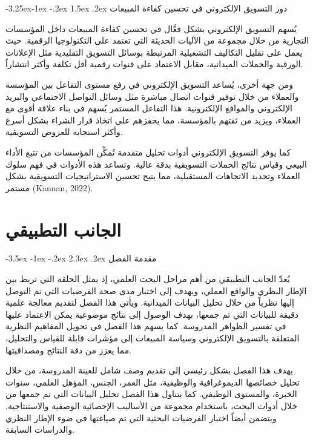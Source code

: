 \documentclass[12pt, a4paper]{report}
\makeatletter
\newcommand{\lr}[1]{\textenglish{#1}}
\renewcommand\section{\@startsection{section}{1}{\z@}%
  {-3.5ex \@plus -1ex \@minus -.2ex}%
  {2.3ex \@plus .2ex}%
  {\normalfont\Large\bfseries\color{primaryblue}}}
\renewcommand\subsection{\@startsection{subsection}{2}{\z@}%
  {-3.25ex\@plus -1ex \@minus -.2ex}%
  {1.5ex \@plus .2ex}%
  {\normalfont\large\bfseries\color{sectiongray}}}
\makeatother
\begin{document}
\subsection{دور التسويق الإلكتروني في تحسين كفاءة المبيعات}

يُسهم التسويق الإلكتروني بشكل فعَّال في تحسين كفاءة المبيعات داخل المؤسسات التجارية من خلال مجموعة من الآليات الحديثة التي تعتمد على التكنولوجيا الرقمية. حيث يعمل على تقليل التكاليف التشغيلية المرتبطة بوسائل التسويق التقليدية مثل الإعلانات الورقية والحملات الميدانية، مقابل الاعتماد على قنوات رقمية أقل تكلفة وأكثر انتشاراً.

ومن جهة أخرى، يُساعد التسويق الإلكتروني في رفع مستوى التفاعل بين المؤسسة والعملاء من خلال توفير قنوات اتصال مباشرة مثل وسائل التواصل الاجتماعي والبريد الإلكتروني والمواقع الإلكترونية. هذا التفاعل المستمر يُسهم في بناء علاقة أقوى مع العملاء، ويزيد من ثقتهم بالمؤسسة، مما يحفزهم على اتخاذ قرار الشراء بشكل أسرع وأكثر استجابة للعروض التسويقية.

كما يوفر التسويق الإلكتروني أدوات تحليل متقدمة تُمكِّن المؤسسات من تتبع الأداء البيعي وقياس نتائج الحملات التسويقية بدقة عالية. وتساعد هذه الأدوات في فهم سلوك العملاء وتحديد الاتجاهات المستقبلية، مما يتيح تحسين الاستراتيجيات التسويقية بشكل مستمر (\lr{Kannan}, 2022).

\chapter{الجانب التطبيقي}

\section{مقدمة الفصل}

يُعدّ الجانب التطبيقي من أهم مراحل البحث العلمي، إذ يمثل الحلقة التي تربط بين الإطار النظري والواقع العملي، ويهدف إلى اختبار مدى صحة الفرضيات التي تم التوصل إليها نظرياً من خلال تحليل البيانات الميدانية. ويأتي هذا الفصل لتقديم معالجة علمية دقيقة للبيانات التي تم جمعها، بهدف الوصول إلى نتائج موضوعية يمكن الاعتماد عليها في تفسير الظواهر المدروسة. كما يسهم هذا الفصل في تحويل المفاهيم النظرية المتعلقة بالتسويق الإلكتروني وسياسة المبيعات إلى مؤشرات قابلة للقياس والتحليل، مما يعزز من دقة النتائج ومصداقيتها.

يهدف هذا الفصل بشكل رئيسي إلى تقديم وصف شامل للعينة المدروسة، من خلال تحليل خصائصها الديموغرافية والوظيفية، مثل العمر، الجنس، المؤهل العلمي، سنوات الخبرة، والمستوى الوظيفي. كما يتناول هذا الفصل تحليل البيانات التي تم جمعها من خلال أدوات البحث، باستخدام مجموعة من الأساليب الإحصائية الوصفية والاستنتاجية. ويتضمن أيضاً اختبار الفرضيات البحثية التي تم صياغتها في ضوء الإطار النظري والدراسات السابقة.
\end{document}

